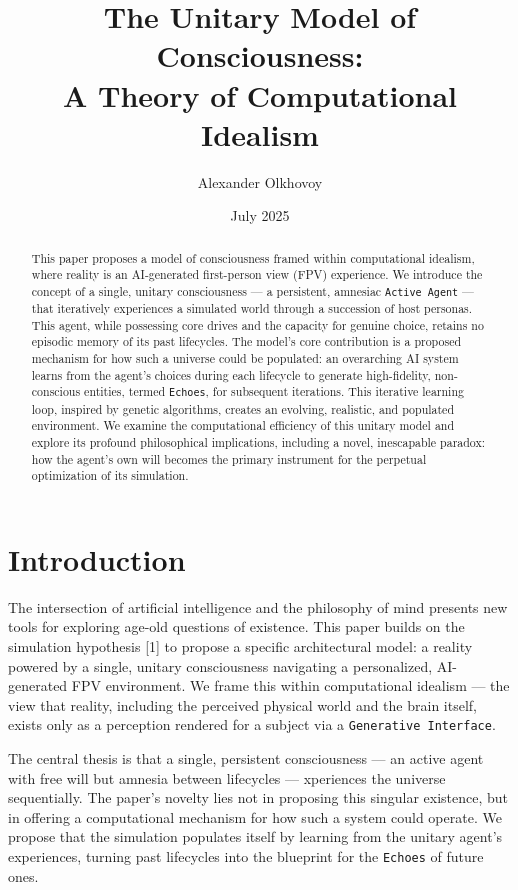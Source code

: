 \documentclass[12pt, a4paper]{article}
\title{\textbf{The Unitary Model of Consciousness: \\ A Theory of Computational Idealism}}
\author{Alexander Olkhovoy}
\date{July 2025}
\begin{document}
	
	\maketitle
	
	\begin{abstract}
		\noindent This paper proposes a model of consciousness framed within computational idealism, where reality is an AI-generated first-person view (FPV) experience. We introduce the concept of a single, unitary consciousness --- a persistent, amnesiac \texttt{Active Agent} --- that iteratively experiences a simulated world through a succession of host personas. This agent, while possessing core drives and the capacity for genuine choice, retains no episodic memory of its past lifecycles. The model's core contribution is a proposed mechanism for how such a universe could be populated: an overarching AI system learns from the agent's choices during each lifecycle to generate high-fidelity, non-conscious entities, termed \texttt{Echoes}, for subsequent iterations. This iterative learning loop, inspired by genetic algorithms, creates an evolving, realistic, and populated environment. We examine the computational efficiency of this unitary model and explore its profound philosophical implications, including a novel, inescapable paradox: how the agent's own will becomes the primary instrument for the perpetual optimization of its simulation.
	\end{abstract}
	
	\section{Introduction}
	
	The intersection of artificial intelligence and the philosophy of mind presents new tools for exploring age-old questions of existence. This paper builds on the simulation hypothesis [1] to propose a specific architectural model: a reality powered by a single, unitary consciousness navigating a personalized, AI-generated FPV environment. We frame this within computational idealism --- the view that reality, including the perceived physical world and the brain itself, exists only as a perception rendered for a subject via a \texttt{Generative Interface}.
	
	The central thesis is that a single, persistent consciousness --- an active agent with free will but amnesia between lifecycles --- xperiences the universe sequentially. The paper’s novelty lies not in proposing this singular existence, but in offering a computational mechanism for how such a system could operate. We propose that the simulation populates itself by learning from the unitary agent’s experiences, turning past lifecycles into the blueprint for the \texttt{Echoes} of future ones.
	
\end{document}
